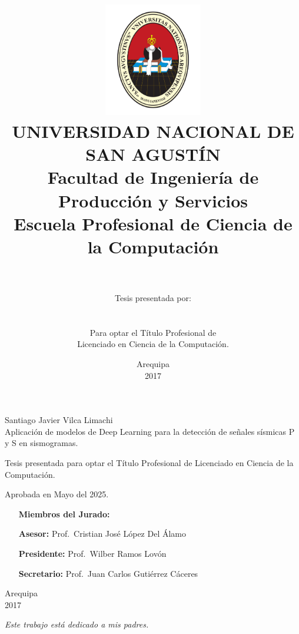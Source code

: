 \documentclass[11pt,a4paper]{report}
\title
{
	\includegraphics[width=0.32\textwidth]{figures/unsa}\\\vspace{0.5cm}
	\large UNIVERSIDAD NACIONAL DE SAN AGUSTÍN\\ 
	\sc Facultad de Ingeniería de Producción y Servicios\\ 
	Escuela Profesional de Ciencia de la Computación\\\vspace{3cm}
	\Large\bf\mytitle\\\vspace{1.5cm}
}
\author{Tesis presentada por:\\{\Large\sc\myauthor}\\\\
		Para optar el Título Profesional de\\Licenciado en Ciencia de la Computación.}
\date{\vspace{3cm}\sc Arequipa\\2017}
\theoremstyle{custom}
\numberwithin{mydef}{chapter}
\def\myauthor{Santiago Javier Vilca Limachi}
\def\mytitle{Aplicación de modelos de Deep Learning para la detección de señales sísmicas P y S en sismogramas.}
\begin{document}
\maketitle

\begin{titlepage}
\begin{center}
{\Large\sc\myauthor}\\\vspace{2cm}
{\Large\mytitle}\\\vspace{3cm}
\end{center}
\null\hfill
\begin{minipage}{0.48\textwidth}
\large
Tesis presentada para optar el Título Profesional de
Licenciado en Ciencia de la Computación.
\end{minipage}

\bigskip\vspace{2cm}
\large Aprobada en Mayo del 2025.\\\vspace{2cm}

\null\hfill
\begin{minipage}{0.52\textwidth}
\large
\begin{itemize}
\item[] \textbf{Miembros del Jurado:}
\item[\bf Asesor:] Prof.\ Cristian José López Del Álamo
\item[\bf Presidente:] Prof.\ Wilber Ramos Lovón
\item[\bf Secretario:] Prof.\ Juan Carlos Gutiérrez Cáceres
\end{itemize}
\end{minipage}

\bigskip\vspace{4cm}
\begin{center}
\large\sc Arequipa\\2017
\end{center}
\end{titlepage}

\begin{titlepage}
\null\vfill\null\hfill\em Este trabajo está dedicado a mis padres.
\end{titlepage}

\setlength{\parskip}{1em}

%

\setlength{\parskip}{0em}
\tableofcontents
\listoffigures
\listoftables

\setlength{\parskip}{1em}

\end{document}
